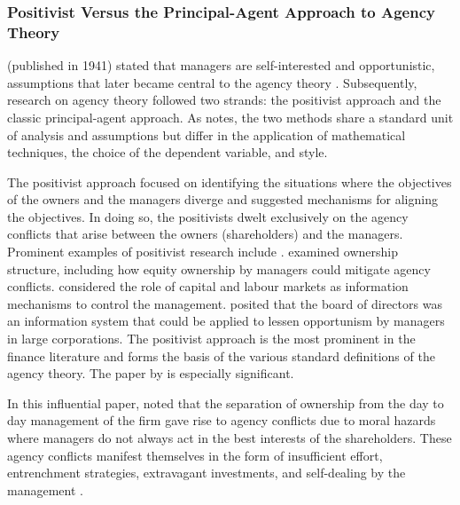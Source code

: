\documentclass[a4paper, nobind]{templates/ociamthesis}
\begin{document}
\hypertarget{positivist-versus-the-principal-agent-approach-to-agency-theory}{%
\subsubsection{Positivist Versus the Principal-Agent Approach to Agency Theory}\label{positivist-versus-the-principal-agent-approach-to-agency-theory}}

\textcite{genoe2011james} (published in 1941) stated that managers are self-interested and opportunistic, assumptions that later became central to the agency theory \autocite{bendickson2016agency}. Subsequently, research on agency theory followed two strands: the positivist approach and the classic principal-agent approach. As \textcite{eisenhardt1989agency} notes, the two methods share a standard unit of analysis and assumptions but differ in the application of mathematical techniques, the choice of the dependent variable, and style.

The positivist approach focused on identifying the situations where the objectives of the owners and the managers diverge and suggested mechanisms for aligning the objectives. In doing so, the positivists dwelt exclusively on the agency conflicts that arise between the owners (shareholders) and the managers. Prominent examples of positivist research include \autocite{jensen1976theory,fama1980agency,jensen1983organization}. \textcite{jensen1976theory} examined ownership structure, including how equity ownership by managers could mitigate agency conflicts. \textcite{fama1980agency} considered the role of capital and labour markets as information mechanisms to control the management. \textcite{fama1983agency} posited that the board of directors was an information system that could be applied to lessen opportunism by managers in large corporations. The positivist approach is the most prominent in the finance literature and forms the basis of the various standard definitions of the agency theory. The paper by \textcite{jensen1976theory} is especially significant.

In this influential paper, \textcite{jensen1976theory} noted that the separation of ownership from the day to day management of the firm gave rise to agency conflicts due to moral hazards where managers do not always act in the best interests of the shareholders. These agency conflicts manifest themselves in the form of insufficient effort, entrenchment strategies, extravagant investments, and self-dealing by the management \autocite{tirole2010theory}.
\end{document}
